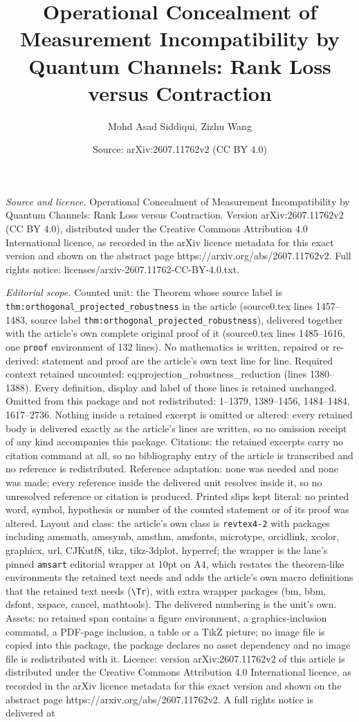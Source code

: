 \documentclass[10pt,a4paper]{amsart}
\title[Operational Concealment of Measurement Incompatibility by Qu]{Operational Concealment of Measurement Incompatibility by Quantum Channels: Rank Loss versus Contraction}
\author{Mohd Asad Siddiqui, Zizhu Wang}
\date{Source: arXiv:2607.11762v2 (CC BY 4.0)}
\begin{document}
\maketitle

\noindent\emph{Source and licence.} Operational Concealment of Measurement Incompatibility by Quantum Channels: Rank Loss versus Contraction. Version arXiv:2607.11762v2 (CC BY 4.0), distributed under the Creative Commons Attribution 4.0 International licence, as recorded in the arXiv licence metadata for this exact version and shown on the abstract page https://arxiv.org/abs/2607.11762v2. Full rights notice: licenses/arxiv-2607.11762-CC-BY-4.0.txt.\par\smallskip

\noindent\textit{Editorial scope.} Counted unit: the Theorem whose source label is \texttt{thm:orthogonal\_projected\_robustness} in the article (source0.tex lines 1457--1483, source label \texttt{thm:orthogonal\_projected\_robustness}), delivered together with the article's own complete original proof of it (source0.tex lines 1485--1616, one \texttt{proof} environment of 132 lines). No mathematics is written, repaired or re-derived: statement and proof are the article's own text line for line. Required context retained uncounted: eq:projection\_robustness\_reduction (lines 1380--1388). Every definition, display and label of those lines is retained unchanged. Omitted from this package and not redistributed: 1--1379, 1389--1456, 1484--1484, 1617--2736. Nothing inside a retained excerpt is omitted or altered: every retained body is delivered exactly as the article's lines are written, so no omission receipt of any kind accompanies this package. Citations: the retained excerpts carry no citation command at all, so no bibliography entry of the article is transcribed and no reference is redistributed. Reference adaptation: none was needed and none was made; every reference inside the delivered unit resolves inside it, so no unresolved reference or citation is produced. Printed slips kept literal: no printed word, symbol, hypothesis or number of the counted statement or of its proof was altered. Layout and class: the article's own class is \texttt{revtex4-2} with packages including amsmath, amssymb, amsthm, amsfonts, microtype, orcidlink, xcolor, graphicx, url, CJKutf8, tikz, tikz-3dplot, hyperref; the wrapper is the lane's pinned \texttt{amsart} editorial wrapper at 10pt on A4, which restates the theorem-like environments the retained text needs and adds the article's own macro definitions that the retained text needs (\texttt{\textbackslash Tr}), with extra wrapper packages (bm, bbm, dsfont, xspace, cancel, mathtools). The delivered numbering is the unit's own. Assets: no retained span contains a figure environment, a graphics-inclusion command, a PDF-page inclusion, a table or a TikZ picture; no image file is copied into this package, the package declares no asset dependency and no image file is redistributed with it. Licence: version arXiv:2607.11762v2 of this article is distributed under the Creative Commons Attribution 4.0 International licence, as recorded in the arXiv licence metadata for this exact version and shown on the abstract page https://arxiv.org/abs/2607.11762v2. A full rights notice is delivered at 
\end{document}
